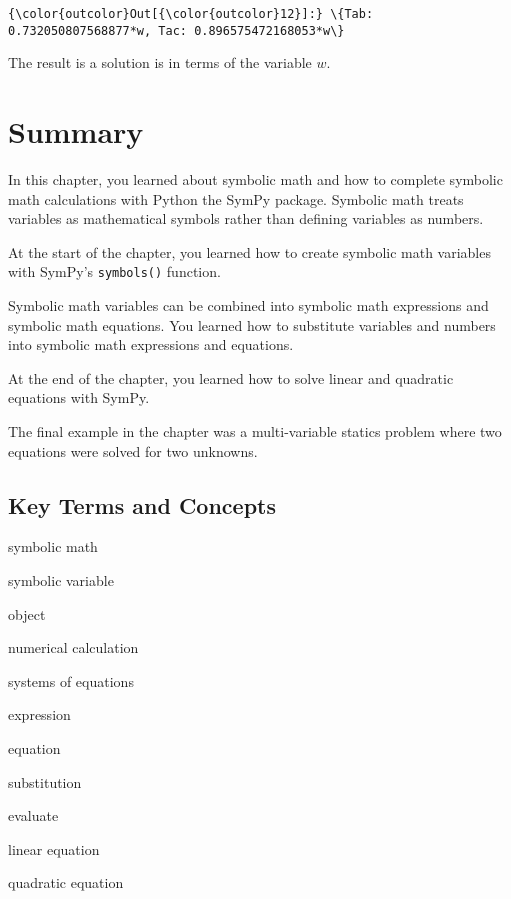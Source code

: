 \documentclass{book}
\newenvironment{key_terms}{\begin{multicols}{3}}{\end{multicols}} %
\newcommand{\passthrough}[1]{#1}
\begin{document}
\begin{Verbatim}[commandchars=\\\{\}]
{\color{outcolor}Out[{\color{outcolor}12}]:} \{Tab: 0.732050807568877*w, Tac: 0.896575472168053*w\}
\end{Verbatim}
            

    
        The result is a solution is in terms of the variable \(w\).
    




    
        \newpage
        \hypertarget{summary}{%
\section{Summary}\label{summary}}

    




    
        In this chapter, you learned about symbolic math and how to complete
symbolic math calculations with Python the SymPy package. Symbolic math
treats variables as mathematical symbols rather than defining variables
as numbers.

At the start of the chapter, you learned how to create symbolic math
variables with SymPy's \passthrough{\lstinline!symbols()!} function.

Symbolic math variables can be combined into symbolic math expressions
and symbolic math equations. You learned how to substitute variables and
numbers into symbolic math expressions and equations.

At the end of the chapter, you learned how to solve linear and quadratic
equations with SymPy.

The final example in the chapter was a multi-variable statics problem
where two equations were solved for two unknowns.
    




    
        \hypertarget{key-terms-and-concepts}{%
\subsection{Key Terms and Concepts}\label{key-terms-and-concepts}}
    




    
        \begin{key_terms}
        symbolic math

symbolic variable

object

numerical calculation

systems of equations

expression

equation

substitution

evaluate

linear equation

quadratic equation
        \end{key_terms}
\end{document}
